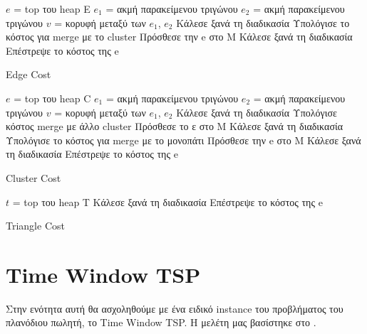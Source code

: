 \documentclass[oneside,12pt]{book}
\theoremstyle{definition}
\begin{document}
\newpage

\begin{algorithm}[H]
	\SetAlgoLined
	
	\(e\) = top του heap Ε \;
	\(e_1\) = ακμή παρακείμενου τριγώνου \;
	\(e_2\) = ακμή παρακείμενου τριγώνου \;	
	\(v\) = κορυφή μεταξύ των \(e_1\), \(e_2\) \;
	{Κάλεσε ξανά τη διαδικασία \;}
	{Υπολόγισε το κόστος για merge με το cluster \;
	Πρόσθεσε την e στο Μ \;
	Κάλεσε ξανά τη διαδικασία \;}
	Επέστρεψε το κόστος της e \;
	
	\caption{Edge Cost}
\end{algorithm}

\newpage

\begin{algorithm}[H]
	\SetAlgoLined
	
	\(e\) = top του heap C \;
	\(e_1\) = ακμή παρακείμενου τριγώνου \;
	\(e_2\) = ακμή παρακείμενου τριγώνου \;	
	\(v\) = κορυφή μεταξύ των \(e_1\), \(e_2\) \;
	{
		{Κάλεσε ξανά τη διαδικασία \;}}
	Υπολόγισε κόστος merge με άλλο cluster \;
	Πρόσθεσε το ε στο Μ \;
	Κάλεσε ξανά τη διαδικασία \;
	{Υπολόγισε το κόστος για merge με το μονοπάτι \;
		Πρόσθεσε την e στο Μ \;
		Κάλεσε ξανά τη διαδικασία \;}
	Επέστρεψε το κόστος της e \;
	
	\caption{Cluster Cost}
\end{algorithm}

\begin{algorithm}[H]
	\SetAlgoLined
	
	\(t\) = top του heap T \;
	{Κάλεσε ξανά τη διαδικασία \;}
	Επέστρεψε το κόστος της e \;
	
	\caption{Triangle Cost}
\end{algorithm}

\section{Time Window TSP}

Στην ενότητα αυτή θα ασχοληθούμε με ένα ειδικό instance του προβλήματος του πλανόδιου πωλητή, το Time Window TSP. Η μελέτη μας βασίστηκε στο \cite{12}. \\
\end{document}
